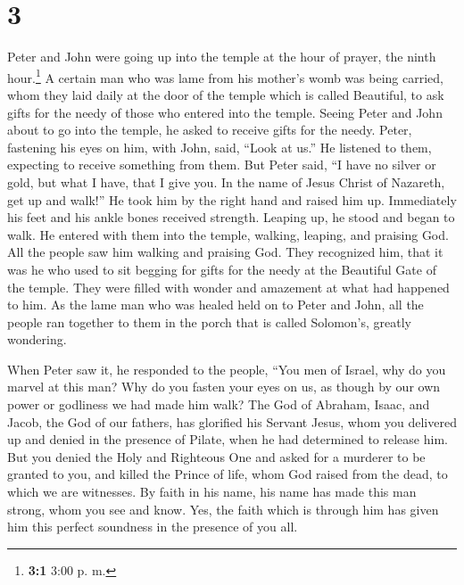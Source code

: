 \hypertarget{section-2}{%
\section{3}\label{section-2}}

 Peter and John were going up into the temple at the hour
of prayer, the ninth hour.\footnote{\textbf{3:1} 3:00 p. m.}
 A certain man who was lame from his mother's womb was
being carried, whom they laid daily at the door of the temple which is
called Beautiful, to ask gifts for the needy of those who entered into
the temple.  Seeing Peter and John about to go into the
temple, he asked to receive gifts for the needy.  Peter,
fastening his eyes on him, with John, said, ``Look at us.''
 He listened to them, expecting to receive something from
them.  But Peter said, ``I have no silver or gold, but
what I have, that I give you. In the name of Jesus Christ of Nazareth,
get up and walk!''  He took him by the right hand and
raised him up. Immediately his feet and his ankle bones received
strength.  Leaping up, he stood and began to walk. He
entered with them into the temple, walking, leaping, and praising God.
 All the people saw him walking and praising God.
 They recognized him, that it was he who used to sit
begging for gifts for the needy at the Beautiful Gate of the temple.
They were filled with wonder and amazement at what had happened to him.
 As the lame man who was healed held on to Peter and
John, all the people ran together to them in the porch that is called
Solomon's, greatly wondering.

 When Peter saw it, he responded to the people, ``You men
of Israel, why do you marvel at this man? Why do you fasten your eyes on
us, as though by our own power or godliness we had made him walk?
 The God of Abraham, Isaac, and Jacob, the God of our
fathers, has glorified his Servant Jesus, whom you delivered up and
denied in the presence of Pilate, when he had determined to release him.
 But you denied the Holy and Righteous One and asked for
a murderer to be granted to you,  and killed the Prince
of life, whom God raised from the dead, to which we are witnesses.
 By faith in his name, his name has made this man strong,
whom you see and know. Yes, the faith which is through him has given him
this perfect soundness in the presence of you all.

